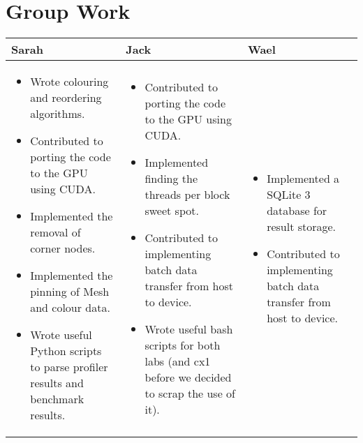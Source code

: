 \section*{Group Work}
\begin{tabular}{|p{5.5cm}| p{5.5cm} | p{5.5cm} |}
  \hline
  Sarah & Jack & Wael\\
  \hline
  \hline
  \begin{itemize}
    \item Wrote colouring and reordering algorithms.
    \item Contributed to porting the code to the GPU using CUDA.
    \item Implemented the removal of corner nodes.
    \item Implemented the pinning of Mesh and colour data.
    \item Wrote useful Python scripts to parse profiler results and benchmark results.
  \end{itemize} &

  \begin{itemize}
    \item Contributed to porting the code to the GPU using CUDA.
    \item Implemented finding the threads per block sweet spot.
    \item Contributed to implementing batch data transfer from host to device.
    \item Wrote useful bash scripts for both labs (and cx1 before we decided to scrap the use of it).
  \end{itemize} &

  \begin{itemize}
    \item Implemented a SQLite 3 database for result storage.
    \item Contributed to implementing batch data transfer from host to device.
  \end{itemize} \\
  \hline
\end{tabular}
